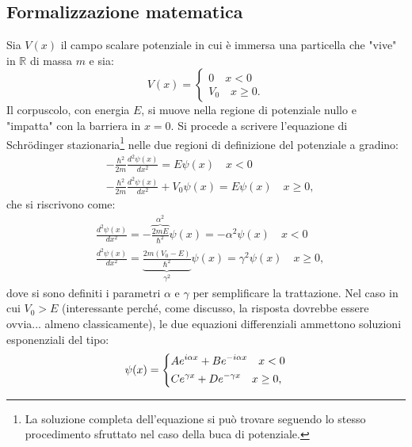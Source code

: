 \documentclass[a4paper,11pt]{report}
\begin{document}
\subsection{Formalizzazione matematica}
Sia $V(x)$ il campo scalare potenziale in cui è immersa una particella che "vive" in $\mathbb{R}$ di massa $m$ e sia:
\begin{equation}
V(x) = 
\begin{cases}
0 \quad x < 0 \\
V_0 \quad x \geq 0.
\end{cases}
\end{equation}
Il corpuscolo, con energia $E$, si muove nella regione di potenziale nullo e "impatta" con la barriera in $x = 0$. Si procede a scrivere l'equazione di Schrödinger stazionaria\footnote{La soluzione completa dell'equazione si può trovare seguendo lo stesso procedimento sfruttato nel caso della buca di potenziale.} nelle due regioni di definizione del potenziale a gradino:
\begin{equation}
\begin{aligned}
&-\frac{\hbar^2}{2m}\frac{d^2 \psi(x)}{d x^2} = E\psi(x) \quad x < 0 \\
&-\frac{\hbar^2}{2m}\frac{d^2 \psi(x)}{d x^2} + V_0\psi(x) = E\psi(x) \quad x \geq 0,
\end{aligned}
\end{equation}
che si riscrivono come:
\begin{equation}
\begin{aligned}
&\frac{d^2 \psi(x)}{d x^2} = -\overbrace{\frac{2mE}{\hbar^2}}^{\alpha^2}\psi(x) = -\alpha^2\psi(x) \quad x < 0 \\
&\frac{d^2 \psi(x)}{d x^2}  = \underbrace{\frac{2m(V_0 - E)}{\hbar^2}}_{\gamma^2}\psi(x) = \gamma^2\psi(x) \quad x \geq 0,
\end{aligned}
\end{equation}
dove si sono definiti i parametri $\alpha$ e $\gamma$ per semplificare la trattazione. Nel caso in cui $V_0 > E$ (interessante perché, come discusso, la risposta dovrebbe essere ovvia... almeno classicamente), le due equazioni differenziali ammettono soluzioni esponenziali del tipo:
\begin{equation}
\psi(x) =
\begin{dcases}
 Ae^{i\alpha x} + Be^{-i\alpha x} \quad x < 0 \\
  Ce^{\gamma x} + De^{-\gamma x} \quad x \geq 0,
\end{dcases}
\end{equation}
\end{document}
